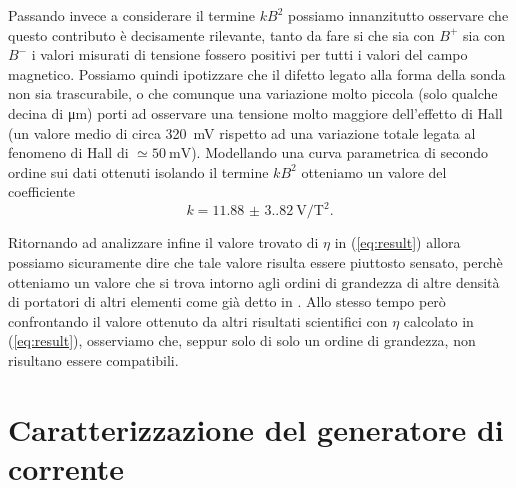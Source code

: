 \documentclass[
    prl,
    reprint, 
    superscriptaddress, 
    altaffilletter, 
    amsmath, 
    amssymb, 
    a4paper,
    varvw]{revtex4-2}
\begin{document}
Passando invece a considerare il termine $kB^2$ possiamo innanzitutto osservare che questo contributo è decisamente rilevante, tanto da fare si che sia con $B^+$ sia con $B^-$ i valori misurati di tensione fossero positivi per tutti i valori del campo magnetico. Possiamo quindi ipotizzare che il difetto legato alla forma della sonda non sia trascurabile, o che comunque una variazione molto piccola (solo qualche decina di \si[]{\micro\metre}) porti ad osservare una tensione molto maggiore dell'effetto di Hall (un valore medio di circa \SI{320}{\milli\volt} rispetto ad una variazione totale legata al fenomeno di Hall di $\simeq\SI{50}{\milli\volt}$). Modellando una curva parametrica di secondo ordine sui dati ottenuti isolando il termine $kB^2$ otteniamo un valore del coefficiente \begin{equation}
    k=\SI{11.88(3.82)}{\volt\per\tesla\squared}.
\end{equation}

Ritornando ad analizzare infine il valore trovato di $\eta$ in (\ref{eq:result}) allora possiamo sicuramente dire che tale valore risulta essere piuttosto sensato, perchè otteniamo un valore che si trova intorno agli ordini di grandezza di altre densità di portatori di altri elementi come già detto in \footnotemark[10]. Allo stesso tempo però confrontando il valore ottenuto da altri risultati scientifici \cite{Hasegawa:2006tu,Michenaud:1972wx,Edelman:1977wy} con $\eta$ calcolato in (\ref{eq:result}), osserviamo che, seppur solo di solo un ordine di grandezza, non risultano essere compatibili.


\appendix
\renewcommand{\thefigure}{\thesection\arabic{figure}}

\section{Caratterizzazione del generatore di corrente}\label{sec:appendix_current_gen}
\end{document}
